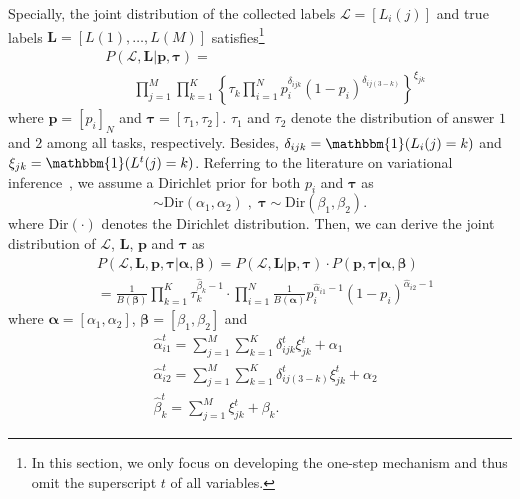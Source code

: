 \documentclass{article}
\begin{document}
Specially, the joint distribution of the collected labels $\mathcal{L}=[L_i(j)]$ and true labels $\bm{L}=[L(1),\ldots, L(M)]$ satisfies\footnote{In this section, we only focus on developing the one-step mechanism and thus omit the superscript $t$ of all variables.}
\begin{equation}
\label{JointDist}
\begin{split}
    &P(\mathcal{L},\bm{L}| \bm{p}, \bm{\tau})=\\ &\qquad \prod_{j=1}^{M}\prod_{k=1}^{K}\left\{\tau_{k}\prod_{i=1}^{N}p_i^{\delta_{ijk}}(1-p_i)^{\delta_{ij(3-k)}} \right\}^{\xi_{jk}}
\end{split}
\end{equation}
where $\bm{p}=[p_i]_N$ and $\bm{\tau}=[\tau_1,\tau_2]$. $\tau_1$ and $\tau_2$ denote the distribution of answer $1$ and $2$ among all tasks, respectively.
Besides,  $\delta_{ijk}=\mathbbm{1}(L_i(j)=k)$ and $\xi_{jk}= \mathbbm{1}(L^{t}(j)=k)$.
Referring to the literature on variational inference~\cite{liu2012variational}, we assume a Dirichlet prior for both $p_i$ and $\bm{\tau}$ as
\begin{equation}
[p_{i}, 1-p_i]\sim \textrm{Dir}(\alpha_{1},\alpha_{2})\;,\; \bm{\tau}\sim \textrm{Dir}(\beta_{1},\beta_{2}).
\end{equation}
where $\textrm{Dir}(\cdot)$ denotes the Dirichlet distribution. Then, we can derive the joint distribution of $\mathcal{L}$, $\bm{L}$, $\bm{p}$ and $\bm{\tau}$ as
\begin{equation}
\label{JointDist2}
\begin{split}
&P(\mathcal{L},\bm{L},\bm{p}, \bm{\tau}|\bm{\alpha}, \bm{\beta})=P(\mathcal{L},\bm{L}|\bm{p}, \bm{\tau})\cdot P(\bm{p}, \bm{\tau}|\bm{\alpha}, \bm{\beta})\\
&=\frac{1}{B(\bm{\beta})}\prod_{k=1}^{K}\tau_k^{\hat{\beta}_k-1}\cdot\prod_{i=1}^{N}\frac{1}{B(\bm{\alpha})}p_i^{\hat{\alpha}_{i1}-1}(1-p_i)^{\hat{\alpha}_{i2}-1}
\end{split}
\end{equation}
where $\bm{\alpha}=[\alpha_1,\alpha_2]$, $\bm{\beta}=[\beta_1,\beta_2]$ and
\begin{equation}
\begin{split}
&\hat{\alpha}^{t}_{i1}={\sum}_{j=1}^{M}{\sum}_{k=1}^{K}\delta^{t}_{ijk}\xi^{t}_{jk}+\alpha_{1}\\
&\hat{\alpha}^{t}_{i2}={\sum}_{j=1}^{M}{\sum}_{k=1}^{K}\delta^{t}_{ij(3-k)}\xi^{t}_{jk}+\alpha_{2}\\
&\hat{\beta}^{t}_k={\sum}_{j=1}^{M}\xi^{t}_{jk}+\beta_{k}.
\end{split}
\end{equation}
\end{document}
